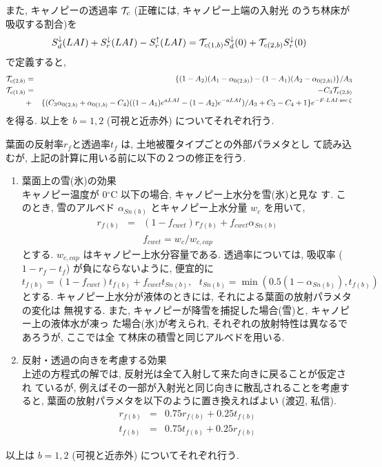 また, キャノピーの透過率 ${\cal{T}}_c$ (正確には, キャノピー上端の入射光
のうち林床が吸収する割合)を
\begin{eqnarray}
 S^{\downarrow}_d(LAI) + S^{\downarrow}_r(LAI) - S^{\uparrow}_r(LAI)
= {\cal{T}}_{c(1,b)} S^{\downarrow}_d(0)
+ {\cal{T}}_{c(2,b)} S^{\downarrow}_r(0)
\end{eqnarray}
で定義すると,
\begin{eqnarray}
  {\cal{T}}_{c(2,b)}&=& \{ ( 1 - A_2 )( A_1 - \alpha_{0(2,b)} )
                      - ( 1 - A_1 )( A_2 - \alpha_{0(2,b)} ) \} / A_3 \\
 {\cal{T}}_{c(1,b)}&=& - C_3 {\cal{T}}_{c(2,b)} \nonumber \\
& + &              \{ ( C_3 \alpha_{0(2,b)} + \alpha_{0(1,b)} -C_4 )
                   ( ( 1 - A_1 ) e^{ a LAI }
                   - ( 1 - A_2 ) e^{-a LAI } )  / A_3
                   + C_3 - C_4 +1 \} e^{- F\cdot LAI\cdot \sec\zeta}
\nonumber \\
\end{eqnarray}
を得る.
以上を $b=1, 2$ (可視と近赤外) についてそれぞれ行う.

葉面の反射率$r_f$と透過率$t_f$ は, 土地被覆タイプごとの外部パラメタとし
て読み込むが, 上記の計算に用いる前に以下の２つの修正を行う.
\begin{enumerate}
 \item 葉面上の雪(氷)の効果 \\
 キャノピー温度が 0$^{\circ}$C 以下の場合, キャノピー上水分を雪(氷)と見な
 す. このとき, 雪のアルベド $\alpha_{Sn(b)}$ とキャノピー上水分量 $w_c$
 を用いて,
\begin{eqnarray}
 r_{f(b)} &=& ( 1 - f_{cwet} ) r_{f(b)}
         + f_{cwet} \alpha_{Sn(b)} \\
 && f_{cwet} = {w_c}/w_{c,cap}
\end{eqnarray}
 とする. $w_{c,cap}$ はキャノピー上水分容量である.
 透過率については, 吸収率 ($1-r_f-t_f$) が負にならないように, 便宜的に
\begin{equation}
 t_{f(b)} = ( 1 - f_{cwet} ) t_{f(b)}
         + f_{cwet} t_{Sn(b)}, \ \ \
 t_{Sn(b)} = \min( 0.5(1 - \alpha_{Sn(b)}), t_{f(b)} )
\end{equation}
 とする.
 キャノピー上水分が液体のときには, それによる葉面の放射パラメタの変化は
 無視する.
 また, キャノピーが降雪を捕捉した場合(雪)と, キャノピー上の液体水が凍っ
 た場合(氷)が考えられ, それぞれの放射特性は異なるであろうが, ここでは全
 て林床の積雪と同じアルベドを用いる.
 \item 反射・透過の向きを考慮する効果 \\
 上述の方程式の解では, 反射光は全て入射して来た向きに戻ることが仮定され
 ているが, 例えばその一部が入射光と同じ向きに散乱されることを考慮すると,
 葉面の放射パラメタを以下のように置き換えればよい (渡辺, 私信).
\begin{eqnarray}
  r_{f(b)} &=& 0.75 r_{f(b)} + 0.25 t_{f(b)} \\
  t_{f(b)} &=& 0.75 t_{f(b)} + 0.25 r_{f(b)}
\end{eqnarray}
\end{enumerate}
以上は $b=1, 2$ (可視と近赤外) についてそれぞれ行う.

